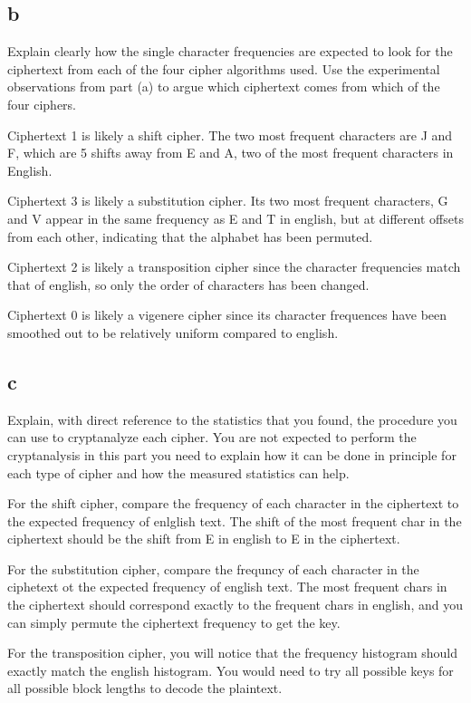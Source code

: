 \documentclass[11pt]{article}
\begin{document}
   
\subsection{b}

Explain clearly how the single character frequencies are expected to look for the ciphertext from each of the four cipher algorithms used. Use the experimental observations from part (a) to argue which ciphertext comes from which of the four ciphers.

Ciphertext 1 is likely a shift cipher. The two most frequent characters are J and F, which are 5 shifts away from E and A, two of the most frequent characters in English.

Ciphertext 3 is likely a substitution cipher. Its two most frequent characters, G and V appear in the same frequency as E and T in english, but at different offsets from each other, indicating that the alphabet has been permuted.

Ciphertext 2 is likely a transposition cipher since the character frequencies match that of english, so only the order of characters has been changed.

Ciphertext 0 is likely a vigenere cipher since its character frequences have been smoothed out to be relatively uniform compared to english.
    
\subsection{c}

Explain, with direct reference to the statistics that you found, the procedure you can use to cryptanalyze each cipher. You are not expected to perform the cryptanalysis in this part you need to explain how it can be done in principle for each type of cipher and how the measured statistics can help.

For the shift cipher, compare the frequency of each character in the ciphertext to the expected frequency of enlglish text. The shift of the most frequent char in the ciphertext should be the shift from E in english to E in the ciphertext.

For the substitution cipher, compare the frequncy of each character in the ciphetext ot the expected frequency of english text. The most frequent chars in the ciphertext should correspond exactly to the frequent chars in english, and you can simply permute the ciphertext frequency to get the key.

For the transposition cipher, you will notice that the frequency histogram should exactly match the english histogram. You would need to try all possible keys for all possible block lengths to decode the plaintext.
\end{document}
